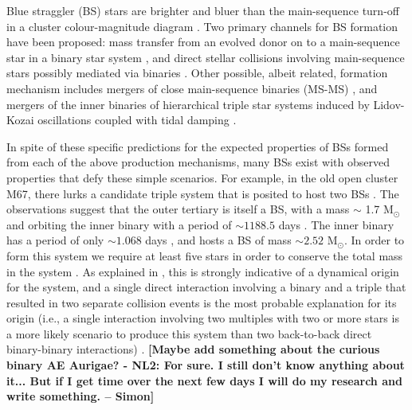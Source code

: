 \documentclass{aastex62}
\def\simon#1{{\bf {\color{red}[#1 -- Simon]}}}
\begin{document}
Blue straggler (BS) stars are brighter and bluer than the
main-sequence turn-off in a cluster colour-magnitude diagram
\citep[e.g.][]{1953AJ.....58...61S,2014ApJ...782...49S}.  Two
primary channels for BS formation have been proposed: mass transfer
from an evolved donor on to a main-sequence star in a binary star
system
\citep[e.g.][]{1964MNRAS.128..147M,1997A&A...328..143P,2009Natur.457..288K,2011MNRAS.410.2370L,2011Natur.478..356G},
and direct stellar collisions involving main-sequence stars possibly
mediated via binaries
\citep[e.g.][]{hills75,1997A&A...328..130P,2007ApJ...661..210L,2013MNRAS.428..897L,2013MNRAS.429.1221H,2018arXiv181100058P}.
Other possible, albeit related, formation mechanism includes mergers
of close main-sequence binaries (MS-MS) \cite{2018arXiv181100058P},
and mergers of the inner binaries of hierarchical triple star systems
induced by Lidov-Kozai oscillations coupled with tidal damping
\citep[e.g.][]{2009ApJ...697.1048P}.

In spite of these specific predictions for the expected properties of
BSs formed from each of the above production mechanisms, many BSs
exist with observed properties that defy these simple scenarios.  For
example, in the old open cluster M67, there lurks a candidate triple
system that is posited to host two BSs
\citep{2001A&A...375..375V,2003AJ....125..810S}.  The observations
suggest that the outer tertiary is itself a BS, with a mass $\sim$ 1.7
M$_{\odot}$ and orbiting the inner binary with a period of $\sim
1188.5$ days \citep{2003AJ....125..810S}.  The inner binary has a
period of only $\sim 1.068$ days \citep{2001A&A...375..375V}, and
hosts a BS of mass $\sim 2.52$ M$_{\odot}$.  In order to form this
system we require at least five stars in order to conserve the total
mass in the system \citep{2011MNRAS.410.2370L}.  As explained in
\citet{2011MNRAS.410.2370L}, this is strongly indicative of a
dynamical origin for the system, and a single direct interaction
involving a binary and a triple that resulted in two separate
collision events is the most probable explanation for its origin
(i.e., a single interaction involving two multiples with two or more
stars is a more likely scenario to produce this system than two
back-to-back direct binary-binary interactions)
\citep{2004MNRAS.350..615G}.  \simon{Maybe add something about the
  curious binary AE Aurigae? - NL2: For sure.  I still don't know
  anything about it... But if I get time over the next few days I will
  do my research and write something.}
\end{document}
